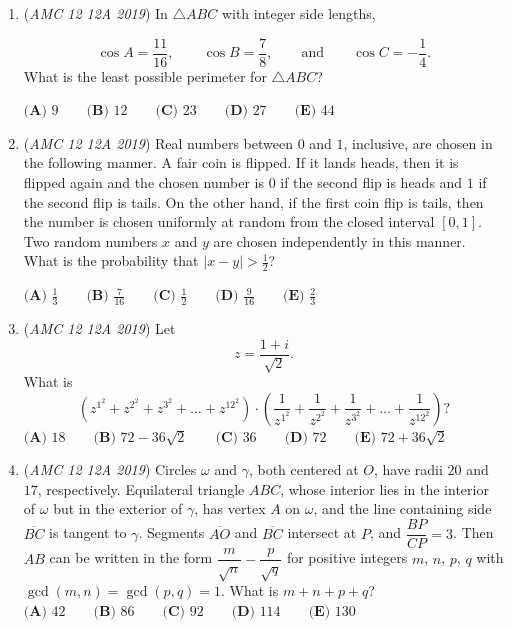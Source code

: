 \begin{enumerate}
 $\textbf{(A) }2\sqrt{3}\qquad \textbf{(B) }4\qquad \textbf{(C) }3\sqrt{2}\qquad \textbf{(D) }2\sqrt{5}\qquad \textbf{(E) }5\qquad$


	\item (\textit{AMC 12 12A 2019}) In $\triangle ABC$ with integer side lengths,

 \[\cos A=\frac{11}{16}, \qquad \cos B= \frac{7}{8}, \qquad \text{and} \qquad\cos C=-\frac{1}{4}.\]
What is the least possible perimeter for $\triangle ABC$?


 $\textbf{(A) } 9 \qquad \textbf{(B) } 12 \qquad \textbf{(C) } 23 \qquad \textbf{(D) } 27 \qquad \textbf{(E) } 44$


	\item (\textit{AMC 12 12A 2019}) Real numbers between $0$ and $1$, inclusive, are chosen in the following manner. A fair coin is flipped. If it lands heads, then it is flipped again and the chosen number is $0$ if the second flip is heads and $1$ if the second flip is tails. On the other hand, if the first coin flip is tails, then the number is chosen uniformly at random from the closed interval $[0,1]$. Two random numbers $x$ and $y$ are chosen independently in this manner. What is the probability that $|x-y| > \frac{1}{2}$?


 $\textbf{(A) } \frac{1}{3} \qquad \textbf{(B) } \frac{7}{16} \qquad \textbf{(C) } \frac{1}{2} \qquad \textbf{(D) } \frac{9}{16} \qquad \textbf{(E) } \frac{2}{3}$


	\item (\textit{AMC 12 12A 2019}) Let 
 \[z=\frac{1+i}{\sqrt{2}}.\]What is 
 \[\left(z^{1^2}+z^{2^2}+z^{3^2}+\dots+z^{{12}^2}\right) \cdot \left(\frac{1}{z^{1^2}}+\frac{1}{z^{2^2}}+\frac{1}{z^{3^2}}+\dots+\frac{1}{z^{{12}^2}}\right)?\]
$\textbf{(A) } 18 \qquad \textbf{(B) } 72-36\sqrt2 \qquad \textbf{(C) } 36 \qquad \textbf{(D) } 72 \qquad \textbf{(E) } 72+36\sqrt2$


	\item (\textit{AMC 12 12A 2019}) Circles $\omega$ and $\gamma$, both centered at $O$, have radii $20$ and $17$, respectively. Equilateral triangle $ABC$, whose interior lies in the interior of $\omega$ but in the exterior of $\gamma$, has vertex $A$ on $\omega$, and the line containing side $\overline{BC}$ is tangent to $\gamma$. Segments $\overline{AO}$ and $\overline{BC}$ intersect at $P$, and $\dfrac{BP}{CP} = 3$. Then $AB$ can be written in the form $\dfrac{m}{\sqrt{n}} - \dfrac{p}{\sqrt{q}}$ for positive integers $m$, $n$, $p$, $q$ with $\gcd(m,n) = \gcd(p,q) = 1$. What is $m+n+p+q$?
$\phantom{  }$
$\textbf{(A) } 42 \qquad \textbf{(B) }86 \qquad \textbf{(C) } 92 \qquad \textbf{(D) } 114 \qquad \textbf{(E) } 130$



\end{enumerate}

